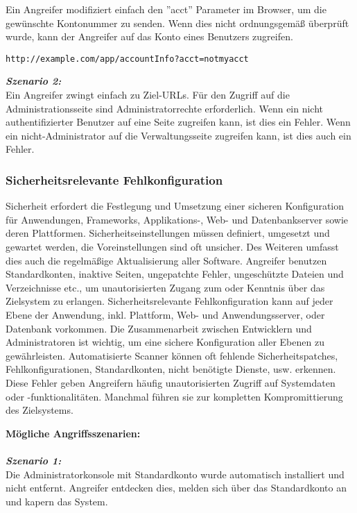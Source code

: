 Ein Angreifer modifiziert einfach den ''acct'' Parameter im Browser, um die gewünschte Kontonummer zu senden. Wenn dies nicht ordnungsgemäß überprüft wurde, kann der Angreifer auf das Konto eines Benutzers zugreifen.

\texttt{http://example.com/app/accountInfo?acct=notmyacct}

\textbf{\textit{Szenario 2:}}\\
Ein Angreifer zwingt einfach zu Ziel-URLs. Für den Zugriff auf die Administrationsseite sind Administratorrechte erforderlich. Wenn ein nicht authentifizierter Benutzer auf eine Seite zugreifen kann, ist dies ein Fehler. Wenn ein nicht-Administrator auf die Verwaltungsseite zugreifen kann, ist dies auch ein Fehler\cite[11]{owasp17top10}.

\subsubsection{Sicherheitsrelevante Fehlkonfiguration}

Sicherheit erfordert die Festlegung und Umsetzung einer sicheren Konfiguration für Anwendungen, Frameworks, Applikations-, Web- und Datenbankserver sowie deren Plattformen. Sicherheitseinstellungen müssen definiert, umgesetzt und gewartet werden, die Voreinstellungen sind oft unsicher. Des Weiteren umfasst dies auch die regelmäßige Aktualisierung aller Software\cite[6]{owasp17top10}. Angreifer benutzen Standardkonten, inaktive Seiten, ungepatchte Fehler, ungeschützte Dateien und Verzeichnisse etc., um unautorisierten Zugang zum oder Kenntnis
über das Zielsystem zu erlangen. Sicherheitsrelevante Fehlkonfiguration
kann auf jeder Ebene der Anwendung, inkl. Plattform, Web- und Anwendungsserver, oder Datenbank vorkommen. Die Zusammenarbeit zwischen Entwicklern und Administratoren ist wichtig, um eine sichere Konfiguration aller Ebenen zu gewährleisten. Automatisierte Scanner können oft fehlende Sicherheitspatches,
Fehlkonfigurationen, Standardkonten, nicht benötigte Dienste, usw. erkennen. Diese Fehler geben Angreifern häufig unautorisierten Zugriff auf Systemdaten oder -funktionalitäten. Manchmal führen sie zur kompletten Kompromittierung des Zielsystems\cite[12]{owasp17top10}.

\textbf{Mögliche Angriffsszenarien:}\\
\\
\textbf{\textit{Szenario 1:}}\\
Die Administratorkonsole mit Standardkonto
wurde automatisch installiert und nicht entfernt. Angreifer
entdecken dies, melden sich über das Standardkonto an und
kapern das System\cite[12]{owasp17top10}.

